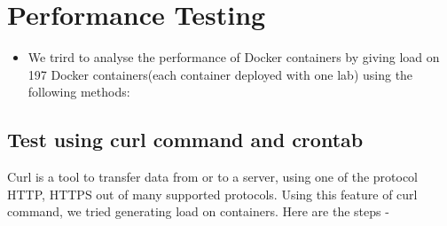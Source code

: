 \documentclass[11pt]{article}
\begin{document}
\section{Performance Testing}
\label{sec:orgheadline50}
\begin{itemize}
\item We trird to analyse the performance of Docker containers by giving load on
197 Docker containers(each container deployed with one lab) using the
following methods:
\end{itemize}
\subsection{Test using curl command and crontab}
\label{sec:orgheadline45}
Curl is a tool to transfer data from or to a server, using one of the
protocol HTTP, HTTPS out of many supported protocols. Using this feature of
curl command, we tried generating load on containers. Here are the steps -
\end{document}
